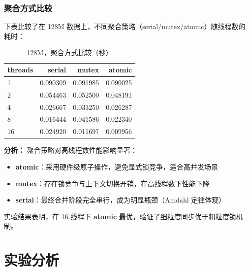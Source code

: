\documentclass{SYSUReport}
\begin{document}
\subsubsection{聚合方式比较}
下表比较了在 128M 数据上，不同聚合策略（serial/mutex/atomic）随线程数的耗时：
\begin{table}[h]
\centering
\caption{128M，聚合方式比较（秒）}
\begin{tabular}{lrrr}
\toprule
threads & serial & mutex & atomic \\
\midrule
1  & 0.090309 & 0.091985 & 0.090025 \\
2  & 0.054463 & 0.052500 & 0.048191 \\
4  & 0.026667 & 0.033250 & 0.026287 \\
8  & 0.016444 & 0.041586 & 0.022340 \\
16 & 0.024920 & 0.011697 & 0.009956 \\
\bottomrule
\end{tabular}
\end{table}

\textbf{分析：} 聚合策略对高线程数性能影响显著：

\begin{itemize}
    \item \textbf{atomic}：采用硬件级原子操作，避免显式锁竞争，适合高并发场景
    \item \textbf{mutex}：存在锁竞争与上下文切换开销，在高线程数下性能下降
    \item \textbf{serial}：最终合并阶段完全串行，成为明显瓶颈（Amdahl 定律体现）
\end{itemize}
实验结果表明，在 16 线程下 \textbf{atomic} 最优，验证了细粒度同步优于粗粒度锁机制。

\section{实验分析}
\end{document}
